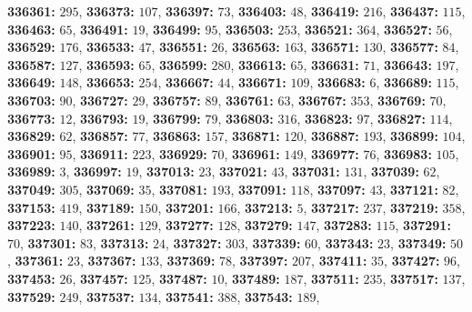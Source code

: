 \textsf{\bfseries 336361:} $295$, \textsf{\bfseries 336373:} $107$, \textsf{\bfseries 336397:} $73$, \textsf{\bfseries 336403:} $48$, \textsf{\bfseries 336419:} $216$, \textsf{\bfseries 336437:} $115$, \textsf{\bfseries 336463:} $65$, \textsf{\bfseries 336491:} $19$, \textsf{\bfseries 336499:} $95$, \textsf{\bfseries 336503:} $253$, \textsf{\bfseries 336521:} $364$, \textsf{\bfseries 336527:} $56$, \textsf{\bfseries 336529:} $176$, \textsf{\bfseries 336533:} $47$, \textsf{\bfseries 336551:} $26$, \textsf{\bfseries 336563:} $163$, \textsf{\bfseries 336571:} $130$, \textsf{\bfseries 336577:} $84$, \textsf{\bfseries 336587:} $127$, \textsf{\bfseries 336593:} $65$, \textsf{\bfseries 336599:} $280$, \textsf{\bfseries 336613:} $65$, \textsf{\bfseries 336631:} $71$, \textsf{\bfseries 336643:} $197$, \textsf{\bfseries 336649:} $148$, \textsf{\bfseries 336653:} $254$, \textsf{\bfseries 336667:} $44$, \textsf{\bfseries 336671:} $109$, \textsf{\bfseries 336683:} $6$, \textsf{\bfseries 336689:} $115$, \textsf{\bfseries 336703:} $90$, \textsf{\bfseries 336727:} $29$, \textsf{\bfseries 336757:} $89$, \textsf{\bfseries 336761:} $63$, \textsf{\bfseries 336767:} $353$, \textsf{\bfseries 336769:} $70$, \textsf{\bfseries 336773:} $12$, \textsf{\bfseries 336793:} $19$, \textsf{\bfseries 336799:} $79$, \textsf{\bfseries 336803:} $316$, \textsf{\bfseries 336823:} $97$, \textsf{\bfseries 336827:} $114$, \textsf{\bfseries 336829:} $62$, \textsf{\bfseries 336857:} $77$, \textsf{\bfseries 336863:} $157$, \textsf{\bfseries 336871:} $120$, \textsf{\bfseries 336887:} $193$, \textsf{\bfseries 336899:} $104$, \textsf{\bfseries 336901:} $95$, \textsf{\bfseries 336911:} $223$, \textsf{\bfseries 336929:} $70$, \textsf{\bfseries 336961:} $149$, \textsf{\bfseries 336977:} $76$, \textsf{\bfseries 336983:} $105$, \textsf{\bfseries 336989:} $3$, \textsf{\bfseries 336997:} $19$, \textsf{\bfseries 337013:} $23$, \textsf{\bfseries 337021:} $43$, \textsf{\bfseries 337031:} $131$, \textsf{\bfseries 337039:} $62$, \textsf{\bfseries 337049:} $305$, \textsf{\bfseries 337069:} $35$, \textsf{\bfseries 337081:} $193$, \textsf{\bfseries 337091:} $118$, \textsf{\bfseries 337097:} $43$, \textsf{\bfseries 337121:} $82$, \textsf{\bfseries 337153:} $419$, \textsf{\bfseries 337189:} $150$, \textsf{\bfseries 337201:} $166$, \textsf{\bfseries 337213:} $5$, \textsf{\bfseries 337217:} $237$, \textsf{\bfseries 337219:} $358$, \textsf{\bfseries 337223:} $140$, \textsf{\bfseries 337261:} $129$, \textsf{\bfseries 337277:} $128$, \textsf{\bfseries 337279:} $147$, \textsf{\bfseries 337283:} $115$, \textsf{\bfseries 337291:} $70$, \textsf{\bfseries 337301:} $83$, \textsf{\bfseries 337313:} $24$, \textsf{\bfseries 337327:} $303$, \textsf{\bfseries 337339:} $60$, \textsf{\bfseries 337343:} $23$, \textsf{\bfseries 337349:} $50$, \textsf{\bfseries 337361:} $23$, \textsf{\bfseries 337367:} $133$, \textsf{\bfseries 337369:} $78$, \textsf{\bfseries 337397:} $207$, \textsf{\bfseries 337411:} $35$, \textsf{\bfseries 337427:} $96$, \textsf{\bfseries 337453:} $26$, \textsf{\bfseries 337457:} $125$, \textsf{\bfseries 337487:} $10$, \textsf{\bfseries 337489:} $187$, \textsf{\bfseries 337511:} $235$, \textsf{\bfseries 337517:} $137$, \textsf{\bfseries 337529:} $249$, \textsf{\bfseries 337537:} $134$, \textsf{\bfseries 337541:} $388$, \textsf{\bfseries 337543:} $189$, 
